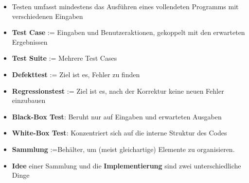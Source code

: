 \documentclass[a4paper,10pt, dvipsnames]{report}
\begin{document}
\begin{itemize}
    \item Testen umfasst mindestens das Ausführen eines vollendeten Programms mit verschiedenen Eingaben
    \item \textbf{Test Case} := Eingaben und Benutzeraktionen, gekoppelt mit den erwarteten Ergebnissen
    \item \textbf{Test Suite} := Mehrere Test Cases
    \item \textbf{Defekttest} := Ziel ist es, Fehler zu finden
    \item \textbf{Regressionstest} := Ziel ist es, nach der Korrektur keine neuen Fehler einzubauen
    \item \textbf{Black-Box Test}: Beruht nur auf Eingaben und erwarteten Ausgaben
    \item \textbf{White-Box Test}: Konzentriert sich auf die interne Struktur des Codes
    \item \textbf{Sammlung} :=Behälter, um (meist gleichartige) Elemente zu organisieren.
    \item \textbf{Idee} einer Sammlung und die \textbf{Implementierung} sind zwei unterschiedliche Dinge
\end{itemize}
\end{document}
